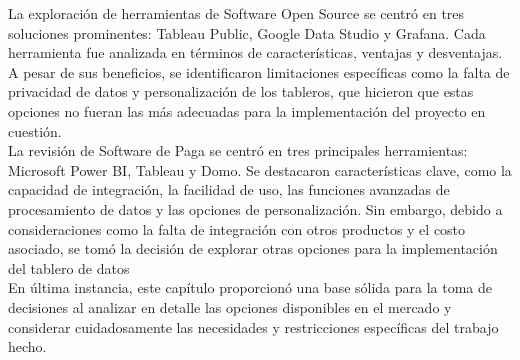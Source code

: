 La exploración de herramientas de Software Open Source se centró en tres soluciones prominentes: Tableau Public, Google Data Studio y Grafana. Cada herramienta fue analizada en términos de características, ventajas y desventajas. A pesar de sus beneficios, se identificaron limitaciones específicas como la falta de privacidad de datos y personalización de los tableros, que hicieron que estas opciones no fueran las más adecuadas para la implementación del proyecto en cuestión.\\

La revisión de Software de Paga se centró en tres principales herramientas: Microsoft Power BI, Tableau y Domo. Se destacaron características clave, como la capacidad de integración, la facilidad de uso, las funciones avanzadas de procesamiento de datos y las opciones de personalización. Sin embargo, debido a consideraciones como la falta de integración con otros productos y el costo asociado, se tomó la decisión de explorar otras opciones para la implementación del tablero de datos\\

En última instancia, este capítulo proporcionó una base sólida para la toma de decisiones al analizar en detalle las opciones disponibles en el mercado y considerar cuidadosamente las necesidades y restricciones específicas del trabajo hecho. 